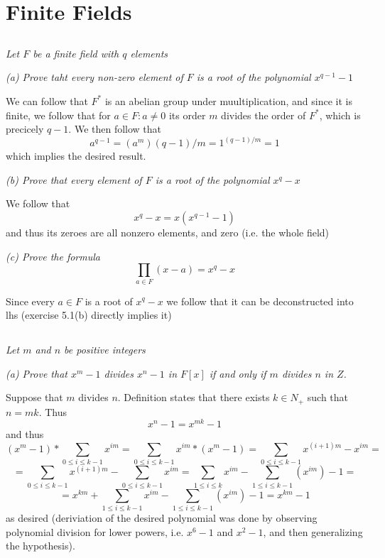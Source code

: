 \documentclass[11pt,oneside,titlepage]{book}
\begin{document}
\section{Finite Fields}

\subsection{}

\textit{Let $F$ be a finite field with $q$ elements}

\textit{(a) Prove taht every non-zero element of $F$ is a root of the
polynomial $x^{q - 1} - 1$}

We can follow that $F^*$ is an abelian group under muultiplication,
and since it is finite, we follow that for $a \in F: a \neq 0$ its
order $m$ divides the order of $F^*$, which is precicely $q - 1$.  We
then follow that
$$a^{q - 1} = (a^m){(q - 1) / m} = 1^{(q - 1) / m} = 1$$
which implies the desired result.

\textit{(b) Prove that every element of $F$ is a root of the
polynomial $x^q - x$}

We follow that
$$x^q - x = x(x^{q - 1} - 1)$$
and thus its zeroes are all nonzero elements, and zero (i.e. the whole
field)

\textit{(c) Prove the formula $$\prod_{a \in F}{(x - a)} = x^q - x$$ }

Since every $a \in F$ is a root of $x^q - x$ we follow that it can be
deconstructed into lhs (exercise 5.1(b) directly implies it)


\subsection{}

\textit{Let $m$ and $n$ be positive integers}

\textit{(a) Prove that $x^m - 1$ divides $x^n - 1$ in $F[x]$ if and
only if $m$ divides $n$ in $Z$.}

Suppose that $m$ divides $n$. Definition states that there exists $k
\in N_+$ such that $n = mk$. Thus
$$x^n - 1 = x^{mk} - 1$$
and thus
$$(x^m - 1) * \sum_{0 \leq i \leq k - 1}{x^{im}} =
\sum_{0 \leq i \leq k - 1}{x^{im} * (x^m - 1)} = \sum_{0 \leq i \leq k
- 1}{x^{(i + 1)m} - x^{im}} =
$$
$$ =
\sum_{0 \leq i \leq k - 1}{x^{(i + 1)m}} - \sum_{0 \leq i \leq k -
1}{x^{im}} = \sum_{1 \leq i \leq k}{x^{im}} - \sum_{1 \leq i \leq k -
1}{(x^{im})} - 1 = $$
$$ =
x^{km} + \sum_{1 \leq i \leq k - 1}{x^{im}} - \sum_{1 \leq i \leq k -
1}{(x^{im})} - 1 = x^{km} - 1
$$
as desired (deriviation of the desired polynomial was done by
observing polynomial division for lower powers, i.e. $x^6 - 1$ and
$x^2 - 1$, and then generalizing the hypothesis).
\end{document}
